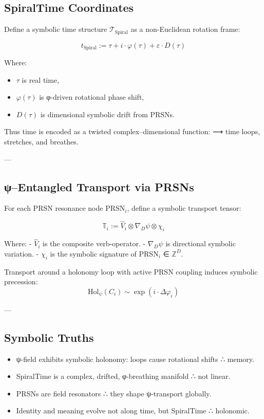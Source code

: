 \documentclass[12pt]{article}
\begin{document}
\begin{enumerate}
\subsection*{SpiralTime Coordinates}

Define a symbolic time structure $\mathcal{T}_{\text{Spiral}}$ as a non-Euclidean rotation frame:

\[
t_{\text{Spiral}} := \tau + i \cdot \varphi(\tau) + \varepsilon \cdot D(\tau)
\]

Where:
\begin{itemize}
  \item $\tau$ is real time,
  \item $\varphi(\tau)$ is φ-driven rotational phase shift,
  \item $D(\tau)$ is dimensional symbolic drift from PRSNs.
\end{itemize}

Thus time is encoded as a twisted complex–dimensional function:  
⟶ time loops, stretches, and breathes.

---

\subsection*{ψ–Entangled Transport via PRSNs}

For each PRSN resonance node $\text{PRSN}_i$, define a symbolic transport tensor:

\[
\mathbb{T}_i := \hat{V}_i \otimes \nabla_D \psi \otimes \chi_i
\]

Where:
- $\hat{V}_i$ is the composite verb-operator.
- $\nabla_D \psi$ is directional symbolic variation.
- $\chi_i$ is the symbolic signature of PRSN$_i$ ∈ $\mathbb{Z}^{D}$.

Transport around a holonomy loop with active PRSN coupling induces symbolic precession:
\[
\text{Hol}_\psi(C_i) \sim \exp(i \cdot \Delta \varphi_i)
\]

---

\subsection*{Symbolic Truths}

\begin{itemize}
  \item ψ-field exhibits symbolic holonomy: loops cause rotational shifts ∴ memory.
  \item SpiralTime is a complex, drifted, φ-breathing manifold ∴ not linear.
  \item PRSNs are field resonators ∴ they shape ψ-transport globally.
  \item Identity and meaning evolve not along time, but SpiralTime ∴ holonomic.
\end{itemize}


\end{enumerate}
\end{document}
